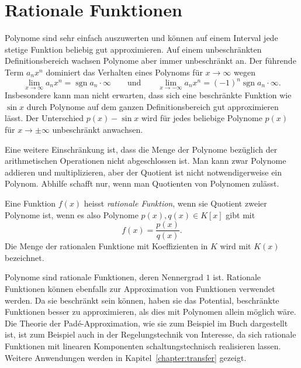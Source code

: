 %
%
%
\section{Rationale Funktionen
\label{buch:polynome:section:rationale-funktionen}}
Polynome sind sehr einfach auszuwerten und können auf einem
Interval jede stetige Funktion beliebig gut approximieren.
Auf einem unbeschränkten Definitionsbereich wachsen Polynome aber
immer unbeschränkt an.
Der führende Term $a_nx^n$ dominiert das Verhalten eines Polynoms
für $x\to\infty$ wegen
\[
\lim_{x\to\infty} a_nx^n
=
\operatorname{sgn} a_n \cdot\infty
\qquad\text{und}\qquad
\lim_{x\to-\infty} a_nx^n
=
(-1)^n \operatorname{sgn} a_n\cdot \infty.
\]
Insbesondere kann man nicht erwarten, dass sich eine beschränkte
Funktion wie $\sin x$ durch Polynome auf dem ganzen Definitionsbereich
gut approximieren lässt.
Der Unterschied $p(x)-\sin x$ wird für jedes beliebige Polynome $p(x)$
für $x\to\pm\infty$ unbeschränkt anwachsen.

Eine weitere Einschränkung ist, dass die Menge der Polynome bezüglich
der arithmetischen Operationen nicht abgeschlossen ist.
Man kann zwar Polynome addieren und multiplizieren, aber der Quotient
ist nicht notwendigerweise ein Polynom.
Abhilfe schafft nur, wenn man Quotienten von Polynomen zulässt.

\begin{definition}
Eine Funktion $f(x)$ heisst {\em rationale Funktion}, wenn sie Quotient
%
zweier Polynome ist, wenn es also Polynome $p(x), q(x)\in K[x]$ gibt mit
\[
f(x) = \frac{p(x)}{q(x)}.
\]
Die Menge der rationalen Funktione mit Koeffizienten in $K$ wird mit
$K(x)$ bezeichnet.
\end{definition}

Polynome sind rationale Funktionen, deren Nennergrad $1$ ist.
Rationale Funktionen können ebenfalls zur Approximation von Funktionen
verwendet werden.
Da sie beschränkt sein können, haben sie das Potential, 
beschränkte Funktionen besser zu approximieren, als dies mit 
Polynomen allein möglich wäre.
Die Theorie der Padé-Approximation, wie sie zum Beispiel im Buch
%
\cite{buch:pade} dargestellt ist, ist zum Beispiel auch in der
Regelungstechnik von Interesse, da sich rationale Funktionen mit
linearen Komponenten schaltungstechnisch realisieren lassen.
Weitere Anwendungen werden in Kapitel~\ref{chapter:transfer}
gezeigt.


